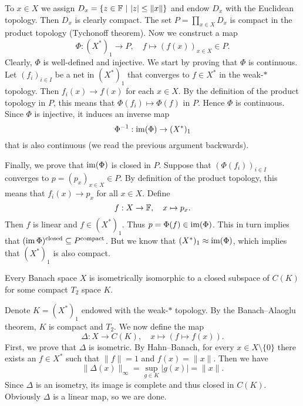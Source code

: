 \begin{myproof}
    To $x \in X$ we assign $D_x = \{z \in \mathbb {F}\ |\ |z| \leq \| x\|\}$
    and endow $D_x$ with the Euclidean topology. Then $D_x$ is clearly compact.
    The set $P = \prod_{x \in X} D_x$ is compact in the product topology (Tychonoff theorem).
    Now we construct a map 
    $$\Phi: (X^*)_1 \to P,\quad f \mapsto (f(x))_{x \in X} \in P.$$
    Clearly, $\Phi$ is well-defined and injective. We start by proving that $\Phi$ is continuous.
    Let $(f_i)_{i \in I}$ be a net in $(X^*)_1$ that converges to $f \in X^*$
    in the weak-$*$ topology. Then $f_i(x) \to f(x)$ for each $x \in X$.
    By the definition of the product topology in $P$, this means that $\Phi(f_i) \mapsto \Phi(f)$ in $P$.
    Hence $\Phi$ is continuous. Since $\Phi$ is injective, it induces an inverse map 
    $$\Phi^{-1}: \operatorname{im} (\Phi) \to (X^*)_1$$
    that is also continuous (we read the previous argument backwards).

    Finally, we prove that $\operatorname{im}(\Phi)$ is closed in $P$. Suppose that $(\Phi(f_i))_{i \in I}$ converges to 
    $p = (p_x)_{x \in X} \in P$. By definition of the product topology, this means that $f_i (x) \to p_x$
    for all $x \in X$. Define $$f: X \to \mathbb {F},\quad x \mapsto p_x.$$
    Then $f$ is linear and $f \in (X^*)_1$. Thus $p = \Phi(f) \in \operatorname{im} (\Phi)$.
    This in turn implies that $(\operatorname{im} \Phi)^{\textrm{closed}} \subseteq P^{\textrm{compact}}$.
    But we know that $(X^*)_1 \approx \operatorname{im} (\Phi)$, which implies that $(X^*)_1$ is also compact.
\end{myproof}

\begin{corollary}
    Every Banach space $X$ is isometrically isomorphic to a closed subspace 
    of $C (K)$ for some compact $T_2$ space $K$.
\end{corollary}

\begin{myproof}
    Denote $K = (X^*)_1$ endowed with the weak-$*$ topology. By the Banach--Alaoglu theorem, $K$ is compact and $T_2$.
    We now define the map $$\Delta: X \to C(K),\quad x \mapsto (f \mapsto f(x)).$$
    First, we prove that $\Delta$ is isometric. By Hahn--Banach, for every $x \in X \setminus\{0\}$ there exists an $f \in X^*$
    such that $\|f\| = 1$ and $f(x) = \|x\|$. Then we have
    \begin{equation*}
        \| \Delta (x)\|_{\infty} = \sup_{g \in K} |g(x)| = \|x\|.
    \end{equation*} 
    Since $\Delta$ is an isometry, its image is complete and thus closed in $C(K)$.
    Obviously $\Delta$ is a linear map, so we are done.
\end{myproof}


